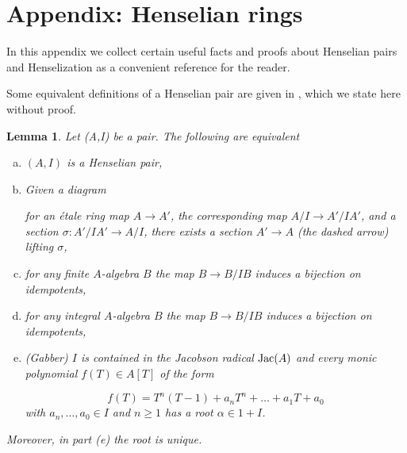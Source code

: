 \documentclass[12pt]{article}
\newcommand{\Jac}{{\rm Jac}}
\newcommand{\Et}{\'etale\xspace}
\newcommand{\spcite}[2]{\cite[\href{https://stacks.math.columbia.edu/tag/#1}{{#2} {#1}}]{stackp}}
\newtheorem{lemma}[theorem]{Lemma}
\theoremstyle{definition}
\numberwithin{equation}{subsection}
\begin{document}
\section{Appendix: Henselian rings}\label{sec:appendix}

In this appendix we collect certain useful facts and proofs about Henselian pairs and Henselization as a convenient reference for the reader.

Some equivalent definitions of a Henselian pair are given in \spcite{09XI}{Lemma}, which we state here without proof. 

\begin{lemma}\label{lem:sphenspair} Let (A,I) be a pair. The following are equivalent \begin{enumerate}[(a)]

\item $(A,I)$ is a Henselian pair,

\item Given a diagram 

\begin{center}
\end{center} \vspace{-.25in}

for an \Et ring map $A \to A'$, the corresponding map $A/I \to A'/IA'$, and a section $\sigma: A'/IA' \to A/I$, there exists a section $A' \to A$ (the dashed arrow) lifting $\sigma$,

\item for any finite $A$-algebra $B$ the map $B \to B/IB$ induces a bijection on idempotents,

\item for any integral $A$-algebra $B$ the map $B \to B/IB$ induces a bijection on idempotents,

\item (Gabber) $I$ is contained in the Jacobson radical $\Jac(A)$ and every monic polynomial $f(T) \in A[T]$ of the form

\begin{equation*} f(T) = T^n(T-1) + a_nT^n+\dots+a_1T+a_0 \end{equation*} 
with $a_n,\dots,a_0 \in I$ and $n \ge 1$ has a root $\alpha \in 1+I$.
\end{enumerate}

Moreover, in part (e) the root is unique.
\end{lemma}
\end{document}
